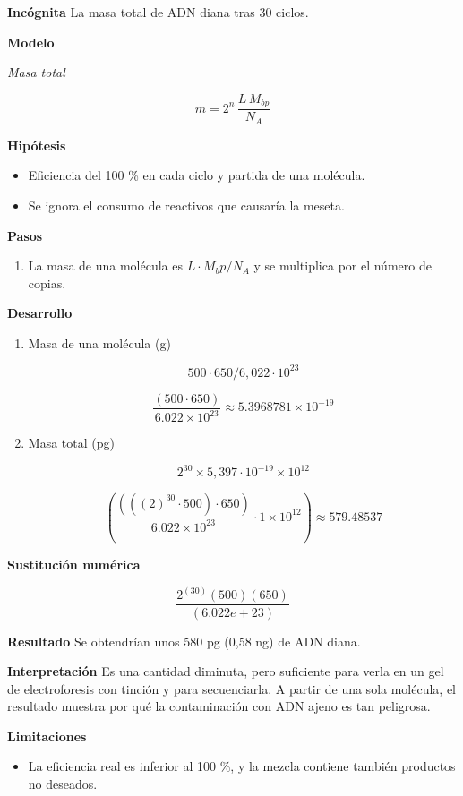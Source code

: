 \documentclass{book}
\begin{document}
\noindent\textbf{Incógnita}
La masa total de ADN diana tras 30 ciclos.


\noindent\textbf{Modelo}

\noindent\textit{Masa total}

\[
m = 2^{n}\,\frac{L\,M_{bp}}{N_A}
\]

\noindent\textbf{Hipótesis}
\begin{itemize}
\item Eficiencia del 100 \% en cada ciclo y partida de una molécula.
\item Se ignora el consumo de reactivos que causaría la meseta.
\end{itemize}

\noindent\textbf{Pasos}
\begin{enumerate}
\item
La masa de una molécula es \(L\cdot M_bp/N_A\) y se multiplica por el número de copias.

\end{enumerate}

\noindent\textbf{Desarrollo}
\begin{enumerate}
\item
Masa de una molécula (g)


\[
500\cdot650/6,022\cdot10^{23}
\]

\[
\frac{\left(500\cdot 650\right)}{6.022\times 10^{23}} \approx 5.3968781\times 10^{-19}
\]
\item
Masa total (pg)


\[
2^{30} \times 5,397\cdot10^{-19} \times 10^{12}
\]

\[
\left(\frac{\left(\left(\left(2\right)^{30}\cdot 500\right)\cdot 650\right)}{6.022\times 10^{23}}\cdot 1\times 10^{12}\right) \approx 579.48537
\]
\end{enumerate}

\noindent\textbf{Sustitución numérica}

\[
\frac{2^{\left(30\right)} \left(500\right) \left(650\right)}{\left(6.022e+23\right)}
\]

\noindent\textbf{Resultado}
Se obtendrían unos 580 pg (0,58 ng) de ADN diana.


\noindent\textbf{Interpretación}
Es una cantidad diminuta, pero suficiente para verla en un gel de electroforesis con tinción y para secuenciarla. A partir de una sola molécula, el resultado muestra por qué la contaminación con ADN ajeno es tan peligrosa.


\noindent\textbf{Limitaciones}
\begin{itemize}
\item La eficiencia real es inferior al 100 \%, y la mezcla contiene también productos no deseados.
\end{itemize}
\end{document}
